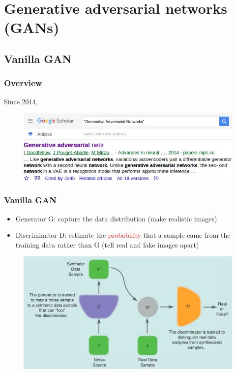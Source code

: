 \documentclass{beamer}
\begin{document}
\section{Generative adversarial networks (GANs)}
\subsection{Vanilla GAN}

\begin{frame}
\frametitle{Overview}
Since 2014,
\begin{figure}
  \includegraphics[width=\textwidth]{GAN_articles.png} \\
  \includegraphics[width=.8\textwidth]{GAN_citation.png}
\end{figure}
\end{frame}

\begin{frame}
\frametitle{Vanilla GAN}
\begin{itemize}
\item Generator G: capture the data distribution (make realistic images)
\item Discriminator D: estimate the \textcolor{red}{probability} that a sample came from the training data rather than G (tell real and fake images apart)
\end{itemize}
\begin{figure}
  \includegraphics[height=.6\textheight]{GAN.png}
\end{figure}
\end{frame}
\end{document}
